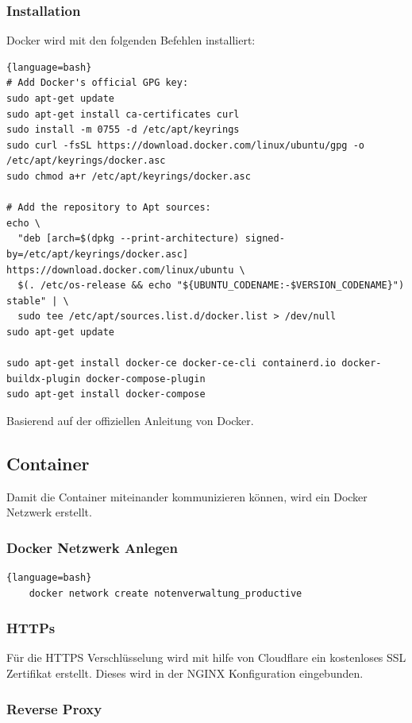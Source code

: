 \documentclass[11pt]{article}
\begin{document}
    \subsubsection{Installation}
    Docker wird mit den folgenden Befehlen installiert:
    \begin{lstlisting}[label={lst:InstallingDocker}]{language=bash}
# Add Docker's official GPG key:
sudo apt-get update
sudo apt-get install ca-certificates curl
sudo install -m 0755 -d /etc/apt/keyrings
sudo curl -fsSL https://download.docker.com/linux/ubuntu/gpg -o /etc/apt/keyrings/docker.asc
sudo chmod a+r /etc/apt/keyrings/docker.asc

# Add the repository to Apt sources:
echo \
  "deb [arch=$(dpkg --print-architecture) signed-by=/etc/apt/keyrings/docker.asc] https://download.docker.com/linux/ubuntu \
  $(. /etc/os-release && echo "${UBUNTU_CODENAME:-$VERSION_CODENAME}") stable" | \
  sudo tee /etc/apt/sources.list.d/docker.list > /dev/null
sudo apt-get update

sudo apt-get install docker-ce docker-ce-cli containerd.io docker-buildx-plugin docker-compose-plugin
sudo apt-get install docker-compose
    \end{lstlisting}
    Basierend auf der offiziellen Anleitung von Docker\cite{docker-ubuntu-install}.

    \subsection{Container}
    Damit die Container miteinander kommunizieren können, wird ein Docker Netzwerk erstellt.

    \subsubsection{Docker Netzwerk Anlegen}
    \begin{lstlisting}{language=bash}
    docker network create notenverwaltung_productive
    \end{lstlisting}

    \subsubsection{HTTPs}
    Für die HTTPS Verschlüsselung wird mit hilfe von Cloudflare ein kostenloses SSL Zertifikat erstellt.
    Dieses wird in der NGINX Konfiguration eingebunden.

    \subsubsection{Reverse Proxy}
\end{document}
